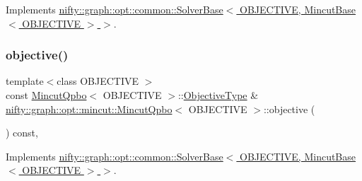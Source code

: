 Implements \hyperlink{classnifty_1_1graph_1_1opt_1_1common_1_1SolverBase_af638b9a804cfec3e35fe87c77e942d30}{nifty\+::graph\+::opt\+::common\+::\+Solver\+Base$<$ O\+B\+J\+E\+C\+T\+I\+V\+E, Mincut\+Base$<$ O\+B\+J\+E\+C\+T\+I\+V\+E $>$ $>$}.

\mbox{\label{classnifty_1_1graph_1_1opt_1_1mincut_1_1MincutQpbo_af607a7941ed3d4976129bf81bfbf5f8f}} 
\subsubsection{\texorpdfstring{objective()}{objective()}}
{\footnotesize\ttfamily template$<$class O\+B\+J\+E\+C\+T\+I\+VE $>$ \\
const \hyperlink{classnifty_1_1graph_1_1opt_1_1mincut_1_1MincutQpbo}{Mincut\+Qpbo}$<$ O\+B\+J\+E\+C\+T\+I\+VE $>$\+::\hyperlink{classnifty_1_1graph_1_1opt_1_1mincut_1_1MincutQpbo_ac598cbbe660ac111ee5af88095d4b6e7}{Objective\+Type} \& \hyperlink{classnifty_1_1graph_1_1opt_1_1mincut_1_1MincutQpbo}{nifty\+::graph\+::opt\+::mincut\+::\+Mincut\+Qpbo}$<$ O\+B\+J\+E\+C\+T\+I\+VE $>$\+::objective (\begin{DoxyParamCaption}{ }\end{DoxyParamCaption}) const\hspace{0.3cm}{\ttfamily [inline]}, {\ttfamily [virtual]}}



Implements \hyperlink{classnifty_1_1graph_1_1opt_1_1common_1_1SolverBase_a55e9eb645c07d6e0782ebfb990ab3c84}{nifty\+::graph\+::opt\+::common\+::\+Solver\+Base$<$ O\+B\+J\+E\+C\+T\+I\+V\+E, Mincut\+Base$<$ O\+B\+J\+E\+C\+T\+I\+V\+E $>$ $>$}.

\mbox{\label{classnifty_1_1graph_1_1opt_1_1mincut_1_1MincutQpbo_a04f877bddd6095ec3f9db4f21db14274}} 

